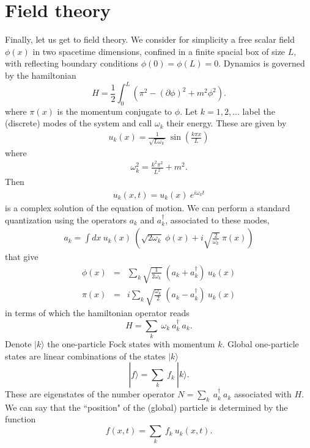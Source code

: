 \documentclass[10pt, nofootinbib]{revtex4}
\newcommand{\be}{\begin{equation}}
\newcommand{\ee}{\end{equation}}
\newcommand{\bea}{\begin{eqnarray}}
\newcommand{\eea}{\end{eqnarray}}
\begin{document}
\section{Field theory}

Finally, let us get to field theory.  We consider for simplicity a
free scalar field $\phi(x)$ in two spacetime dimensions, confined in a
finite spacial box of size $L$, with reflecting boundary conditions
$\phi(0)=\phi(L)=0$.  Dynamics is governed by the hamiltonian  
%
\be
H = \frac{1}{2} \int_{0}^L \left(\pi^2-(\partial\phi)^2+m^2\phi^2 \right).
\ee
%
where $\pi(x)$ is the momentum conjugate to $\phi$. 
Let $k=1,2,\ldots$ label the (discrete) modes of the system and call
$\omega_{k}$ their energy. These are given by 
%
\bea 
u_{k}(x)= \frac{1}{\sqrt{L \omega_{k}}} \  
\sin \left( \frac{k \pi x}{L}
\right)
\eea
%
where 
%
\bea
\omega_{k}^2 = \frac{k^2 \pi^2}{L^2} + m^2. 
\eea
%
Then 
%
\bea 
u_k(x,t) = u_{k}(x)\ e^{i \omega_{k} t}
\eea
%
is a complex solution of the equation of motion.  We can perform a
standard quantization using the operators $a_{k}$ and $a_{k}^\dagger$,
associated to these modes,
%
\bea 
a_{k} = \int dx\ u_{k}(x) \ \left( \sqrt{2\omega_{k}}\ \phi(x)+i
\sqrt{\frac{2}{\omega_{k}}}\ \pi(x)\right)
\eea
%
that give
%
\bea 
\phi(x)&=&\sum_{k} \sqrt{\frac{1}{2\omega_{k}}}\ 
(a_{k}+a^\dagger_{k})\  
u_{k}(x)\\
\pi(x)&=& i\sum_{k} \sqrt{\frac{\omega_{k}}{2}}\ 
(a_{k}-a^\dagger_{k}) \ 
u_{k}(x)
\eea
%
in terms of which the hamiltonian operator
reads
%
\be
H = \sum_{k}\ \omega_{k}\ a^\dagger_{k}\ a_{k}.
\ee
%
Denote $|k\rangle$ the one-particle Fock states with momentum $k$. 
Global one-particle states are linear combinations of the states
$|k\rangle$ 
%
\be
|f\rangle = \sum_{k}\ f_{k}\ |k\rangle.
\ee
%
These are eigenstates of the number operator $N=\sum_{k}\
a^\dagger_{k}\ a_{k}$ associated with $H$.  We can say that the
``position" of the (global) particle is determined by the function
%
\be
f(x,t)=  \sum_{k}\ f_{k}\ u_k(x,t). 
\ee
%
\end{document}

